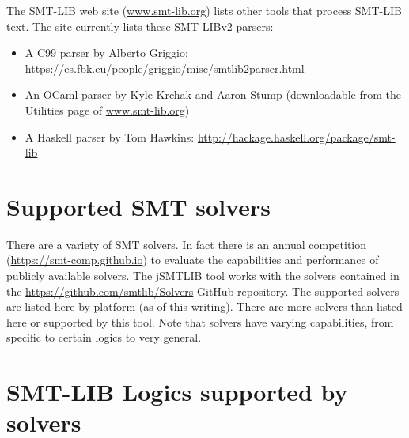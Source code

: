 \documentclass[12pt,oneside]{report}
\begin{document}
The SMT-LIB web site (\url{www.smt-lib.org}) lists other tools that process SMT-LIB text. The site currently lists these SMT-LIBv2 parsers:
\begin{itemize}
\item A C99 parser by Alberto Griggio:\\ \url{https://es.fbk.eu/people/griggio/misc/smtlib2parser.html}
\item An OCaml parser  by Kyle Krchak and Aaron Stump (downloadable from the Utilities page of \url{www.smt-lib.org})
\item A Haskell parser by Tom Hawkins: \url{http://hackage.haskell.org/package/smt-lib}
\end{itemize}

\appendix

\chapter{Supported SMT solvers}

There are a variety of SMT solvers.  In fact there is an annual competition (\url{https://smt-comp.github.io}) to evaluate the capabilities and performance of publicly available solvers.  The jSMTLIB tool works with the solvers contained in the \url{https://github.com/smtlib/Solvers} GitHub repository.  The supported solvers are listed here by platform (as of this writing).  There are more solvers than listed here or supported by this tool.  Note that solvers have varying capabilities, from specific to certain logics to very general.



\chapter{SMT-LIB Logics supported by solvers}
\end{document}
